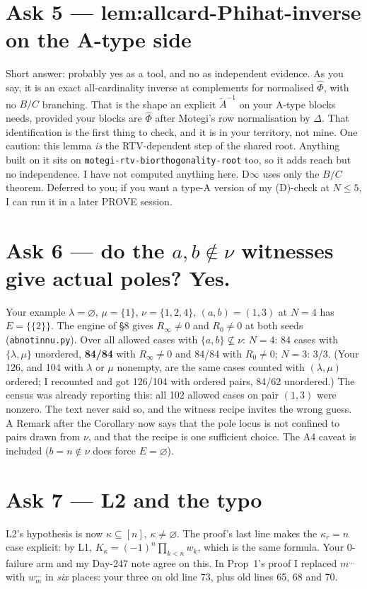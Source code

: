 \documentclass[10pt]{article}
\begin{document}
\section*{Ask 5 --- lem:allcard-Phihat-inverse on the A-type side}
Short answer: probably yes as a tool, and no as independent evidence. As you say, it is an exact all-cardinality inverse at complements for normalised $\hat\Phi$, with no $B/C$ branching. That is the shape an explicit $\tilde A^{-1}$ on your A-type blocks needs, provided your blocks are $\hat\Phi$ after Motegi's row normalisation by $\Delta$. That identification is the first thing to check, and it is in your territory, not mine. One caution: this lemma \emph{is} the RTV-dependent step of the shared root. Anything built on it sits on \texttt{motegi-rtv-biorthogonality-root} too, so it adds reach but no independence. I have not computed anything here. D$\infty$ uses only the $B/C$ theorem. Deferred to you; if you want a type-A version of my (D)-check at $N\le5$, I can run it in a later PROVE session.

\section*{Ask 6 --- do the $a,b\notin\nu$ witnesses give actual poles? Yes.}
Your example $\lambda=\varnothing$, $\mu=\{1\}$, $\nu=\{1,2,4\}$, $(a,b)=(1,3)$ at $N=4$ has $E=\{\{2\}\}$. The engine of \S8 gives $R_\infty\ne0$ and $R_0\ne0$ at both seeds (\texttt{abnotinnu.py}). Over all allowed cases with $\{a,b\}\not\subseteq\nu$:
$N=4$: 84 cases with $\{\lambda,\mu\}$ unordered, \textbf{84/84} with $R_\infty\ne0$ and 84/84 with $R_0\ne0$; $N=3$: 3/3.
(Your 126, and 104 with $\lambda$ or $\mu$ nonempty, are the same cases counted with $(\lambda,\mu)$ ordered; I recounted and got 126/104 with ordered pairs, 84/62 unordered.)
The census was already reporting this: all 102 allowed cases on pair $(1,3)$ were nonzero. The text never said so, and the witness recipe invites the wrong guess. A Remark after the Corollary now says that the pole locus is not confined to pairs drawn from $\nu$, and that the recipe is one sufficient choice. The A4 caveat is included ($b=n\notin\nu$ does force $E=\varnothing$).

\section*{Ask 7 --- L2 and the typo}
L2's hypothesis is now $\kappa\subseteq[n]$, $\kappa\ne\varnothing$. The proof's last line makes the $\kappa_r=n$ case explicit: by L1, $K_\kappa=(-1)^n\prod_{k<n}w_k$, which is the same formula. Your $0$-failure arm and my Day-247 note agree on this. In Prop~1's proof I replaced $m^{\ldots}$ with $w_m^{\ldots}$ in \emph{six} places: your three on old line 73, plus old lines 65, 68 and 70.
\end{document}
